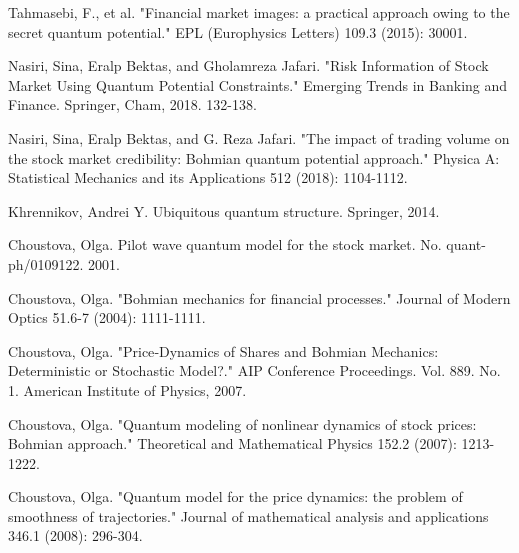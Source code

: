 \documentclass[a4paper,titlepage,12pt,fleqn,oneside]{report}
\begin{document}
\begin{thebibliography}{99}
	\begin{LTRitems}
		Tahmasebi, F., et al. "Financial market images: a practical approach owing to the secret quantum potential." EPL (Europhysics Letters) 109.3 (2015): 30001.
	\end{LTRitems}
	
	\begin{LTRitems}
		\bibitem{nas1}
		Nasiri, Sina, Eralp Bektas, and Gholamreza Jafari. "Risk Information of Stock Market Using Quantum Potential Constraints." Emerging Trends in Banking and Finance. Springer, Cham, 2018. 132-138.
	\end{LTRitems}
	
	\begin{LTRitems}
		\bibitem{nas2}
		Nasiri, Sina, Eralp Bektas, and G. Reza Jafari. "The impact of trading volume on the stock market credibility: Bohmian quantum potential approach." Physica A: Statistical Mechanics and its Applications 512 (2018): 1104-1112.
	\end{LTRitems}
	
	\begin{LTRitems}
		\bibitem{kh4}
		Khrennikov, Andrei Y. Ubiquitous quantum structure. Springer, 2014.
	\end{LTRitems}
	
	\begin{LTRitems}
		\bibitem{olg1}
		Choustova, Olga. Pilot wave quantum model for the stock market. No. quant-ph/0109122. 2001.
	\end{LTRitems}
	
	\begin{LTRitems}
		\bibitem{olg2}
		Choustova, Olga. "Bohmian mechanics for financial processes." Journal of Modern Optics 51.6-7 (2004): 1111-1111.
	\end{LTRitems}
	
	\begin{LTRitems}
		\bibitem{olg3}
		Choustova, Olga. "Price‐Dynamics of Shares and Bohmian Mechanics: Deterministic or Stochastic Model?." AIP Conference Proceedings. Vol. 889. No. 1. American Institute of Physics, 2007.
	\end{LTRitems}
	
	\begin{LTRitems}
		\bibitem{olg4}
		Choustova, Olga. "Quantum modeling of nonlinear dynamics of stock prices: Bohmian approach." Theoretical and Mathematical Physics 152.2 (2007): 1213-1222.
	\end{LTRitems}
	
	\begin{LTRitems}
		\bibitem{olg5}
		Choustova, Olga. "Quantum model for the price dynamics: the problem of smoothness of trajectories." Journal of mathematical analysis and applications 346.1 (2008): 296-304.
	\end{LTRitems}
	

\end{thebibliography}
\end{document}
